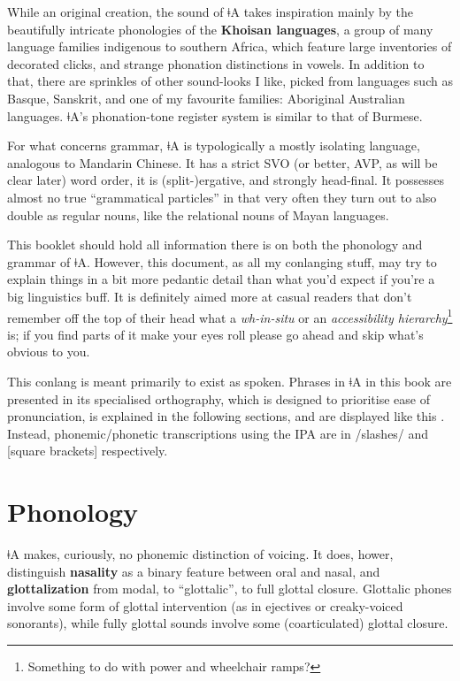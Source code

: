 \documentclass[11pt,a5paper]{book}
\newcommand{\qcn}[1]{\textcolor{AccentText}{\large#1}}
\newcommand{\langname}{\qcn{ǂA}}
\begin{document}
While an original creation, the sound of \langname{} takes inspiration mainly by the beautifully intricate phonologies of the \textbf{Khoisan languages}, a group of many language families indigenous to southern Africa, which feature large inventories of decorated clicks, and strange phonation distinctions in vowels. In addition to that, there are sprinkles of other sound-looks I like, picked from languages such as Basque, Sanskrit, and one of my favourite families: Aboriginal Australian languages. \langname{}'s phonation-tone register system is similar to that of Burmese.

For what concerns grammar, \langname{} is typologically a mostly isolating language, analogous to Mandarin Chinese. It has a strict SVO (or better, AVP, as will be clear later) word order, it is \mbox{(split-)ergative}, and strongly head-final. It possesses almost no true ``grammatical particles'' in that very often they turn out to also double as regular nouns, like the relational nouns of Mayan languages.

This booklet should hold all information there is on both the phonology and grammar of \langname{}. However, this document, as all my conlanging stuff, may try to explain things in a bit more pedantic detail than what you'd expect if you're a big linguistics buff. It is definitely aimed more at casual readers that don't remember off the top of their head what a \emph{wh-in-situ} or an \emph{accessibility hierarchy}\footnote{Something to do with power and wheelchair ramps?} is; if you find parts of it make your eyes roll please go ahead and skip what's obvious to you.

This conlang is meant primarily to exist as spoken. Phrases in \langname{} in this book are presented in its specialised orthography, which is designed to prioritise ease of pronunciation, is explained in the following sections, and are displayed \qcn{like this	}. Instead, phonemic/phonetic transcriptions using the IPA are in /slashes/ and [square brackets] respectively.


\tableofcontents

\chapter{Phonology}

\langname{} makes, curiously, no phonemic distinction of voicing. It does, hower, distinguish \textbf{nasality} as a binary feature between oral and nasal, and \textbf{glottalization} from modal, to ``glottalic'', to full glottal closure. Glot\-talic phones involve some form of glot\-tal in\-ter\-ven\-tion (as in ejec\-tives or crea\-ky-voiced so\-no\-rants), while fully glottal sounds involve some (coarticulated) glottal closure. 
\end{document}
